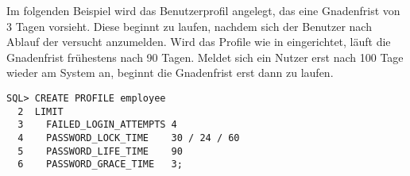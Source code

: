 
        Im folgenden Beispiel wird das Benutzerprofil  angelegt, das eine Gnadenfrist von 3 Tagen vorsieht. Diese beginnt zu laufen, nachdem sich der Benutzer nach Ablauf der  versucht anzumelden. Wird das Profile wie in  eingerichtet, läuft die Gnadenfrist frühestens nach 90 Tagen. Meldet sich ein Nutzer erst nach 100 Tage wieder am System an, beginnt die Gnadenfrist erst dann zu laufen.
        \begin{lstlisting}[caption={Passwortlebensdauer und
        Gnadenfrist},label=admin220,language=oracle_sql]
SQL> CREATE PROFILE employee
  2  LIMIT
  3    FAILED_LOGIN_ATTEMPTS 4
  4    PASSWORD_LOCK_TIME    30 / 24 / 60
  5    PASSWORD_LIFE_TIME    90
  6    PASSWORD_GRACE_TIME   3;
        \end{lstlisting}

